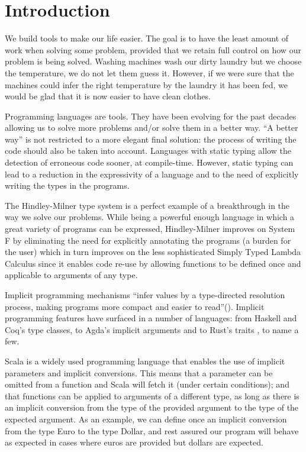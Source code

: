 \chapter{Introduction}
\label{cha:intro}
We build tools to make our life easier. The goal is to have the least amount of work when solving some problem, provided that we retain full control on how our problem is being solved. Washing machines wash our dirty laundry but we choose the temperature, we do not let them guess it. However, if we were sure that the machines could infer the right temperature by the laundry it has been fed, we would be glad that it is now easier to have clean clothes.

Programming languages are tools. They have been evolving for the past decades allowing us to solve more problems and/or solve them in a better way. ``A better way'' is not restricted to a more elegant final solution: the process of writing the code should also be taken into account. Languages with static typing allow the detection of erroneous code sooner, at compile-time. However, static typing can lead to a reduction in the expressivity of a language and to the need of explicitly writing the types in the programs.

The Hindley-Milner type system \cite{damas,hm2,hm3} is a perfect example of a breakthrough in the way we solve our problems. While being a powerful enough language in which a great variety of programs can be expressed, Hindley-Milner improves on System F by eliminating the need for explicitly annotating the programs (a burden for the user) which in turn improves on the less sophisticated Simply Typed Lambda Calculus since it enables code re-use by allowing functions to be defined once and applicable to arguments of any type.

Implicit programming mechanisms ``infer values by a type-directed resolution process, making programs more compact and easier to read''(\cite{cochis}). Implicit programming features have surfaced in a number of languages: from Haskell \cite{adhoc} and Coq's \cite{coq} type classes, to Agda's implicit arguments \cite{agda} and to Rust's traits \cite{rust}, to name a few. 

Scala \cite{scala} is a widely used programming language that enables the use of implicit parameters and implicit conversions. This means that a parameter can be omitted from a function and Scala will fetch it (under certain conditions); and that functions can be applied to arguments of a different type, as long as there is an implicit conversion from the type of the provided argument to the type of the expected argument. As an example, we can define once an implicit conversion from the type Euro to the type Dollar, and rest assured our program will behave as expected in cases where euros are provided but dollars are expected.


